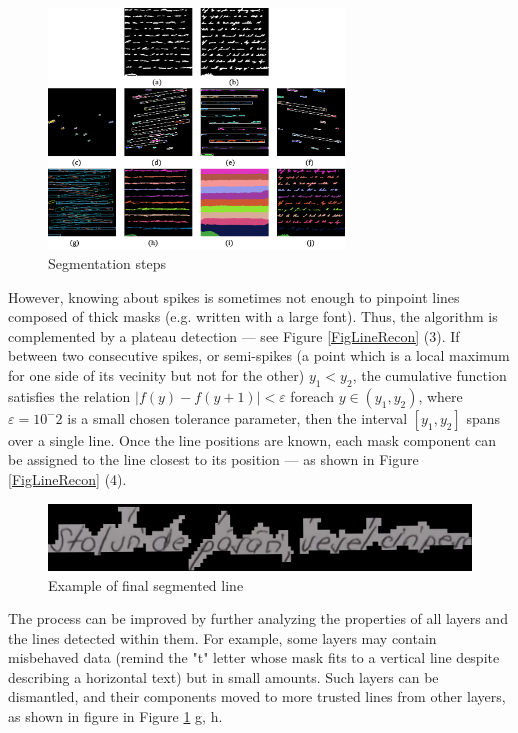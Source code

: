 \begin{figure}[htbp]
    \centering
        \includegraphics[width=0.7\textwidth]{figures/seg_steps.png}
    \caption{Segmentation steps}
    \label{FigSegSteps}        
\end{figure}

However, knowing about spikes is sometimes not enough to pinpoint lines composed of thick masks (e.g. written with a large font). Thus, the algorithm is complemented by a plateau detection --- see Figure \ref{FigLineRecon} (3). If between two consecutive spikes, or semi-spikes (a point which is a local maximum for one side of its vecinity but not for the other) $y_1<y_2$, the cumulative function satisfies the relation $|f(y)-f(y+1)|<\varepsilon$ foreach $y\in(y_1,y_2)$, where $\varepsilon=10^-2$ is a small chosen tolerance parameter, then the interval $[y_1,y_2]$ spans over a single line. Once the line positions are known, each mask component can be assigned to the line closest to its position --- as shown in Figure \ref{FigLineRecon} (4). 

\begin{figure}[htbp]
    \centering
        \includegraphics[scale=0.7]{figures/seg_example.png}
    \caption{Example of final segmented line}    
    \label{FigSegmentedLineExample}        
\end{figure}


The process can be improved by further analyzing the properties of all layers and the lines detected within them. For example, some layers may contain misbehaved data (remind the "t" letter whose mask fits to a vertical line despite describing a horizontal text) but in small amounts. Such layers can be dismantled, and their components moved to more trusted lines from other layers, as shown in figure in Figure \ref{FigSegSteps} g, h.

